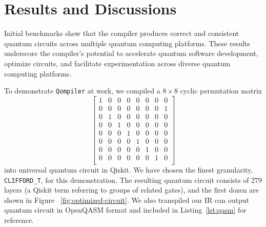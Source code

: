 \documentclass[a4paper,titlepage]{article}
\begin{document}
    \section{Results and Discussions}\label{sec:results}
    Initial benchmarks show that the compiler produces correct and consistent quantum circuits across multiple quantum computing platforms.
    These results underscore the compiler’s potential to accelerate quantum software development,
    optimize circuits, and facilitate experimentation across diverse quantum computing platforms.

    To demonstrate \texttt{Qompiler} at work, we compiled a $ 8 \times 8 $ cyclic permutation matrix
    \begin{equation}
        \label{eq:cyclic-permute-mat}
        \begin{bmatrix}
            1 & 0 & 0 & 0 & 0 & 0 & 0 & 0 \\
            0 & 0 & 0 & 0 & 0 & 0 & 0 & 1 \\
            0 & 1 & 0 & 0 & 0 & 0 & 0 & 0 \\
            0 & 0 & 1 & 0 & 0 & 0 & 0 & 0 \\
            0 & 0 & 0 & 1 & 0 & 0 & 0 & 0 \\
            0 & 0 & 0 & 0 & 1 & 0 & 0 & 0 \\
            0 & 0 & 0 & 0 & 0 & 1 & 0 & 0 \\
            0 & 0 & 0 & 0 & 0 & 0 & 1 & 0 \\
        \end{bmatrix}
    \end{equation}
    into universal quantum circuit in Qiskit.
    We have chosen the finest granularity, \texttt{CLIFFORD\_T}, for this demonstration.
    The resulting quantum circuit consists of 279 layers (a Qiskit term referring to groups of related gates),
    and the first dozen are shown in Figure ~\ref{fig:optimized-circuit}.
    We also transpiled our IR can output quantum circuit in OpenQASM format
    and included in Listing~\ref{lst:qasm} for reference.

\end{document}

